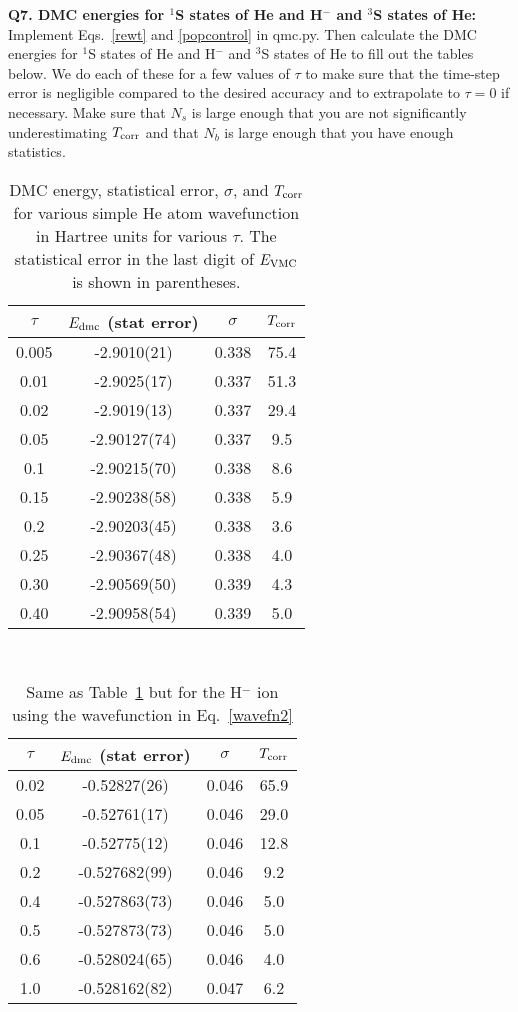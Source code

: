 \documentclass[11pt,aps,prb,amsmath,amssymb,superscriptaddress,notitlepage]{revtex4-1}
\def\Tcorr{T_{\rm corr}}
\providecommand{\tabularnewline}{\\}
\begin{document}
{\color{blue}
\textbf{Q7. DMC energies for $^1$S states of He and H$^-$ and $^3$S states of He:}\\
Implement Eqs.~\ref{rewt} and \ref{popcontrol} in qmc.py.
Then calculate the DMC energies for $^1$S states of He and H$^-$ and $^3$S states of He to fill out the
tables below.  We do each of these for a few values of $\tau$ to make sure that the time-step error is
negligible compared to the desired accuracy and to extrapolate to $\tau=0$ if necessary.
Make sure that $N_s$ is large enough that you are not significantly underestimating $\Tcorr$
and that $N_b$ is large enough that you have enough statistics.

\begin{table}[H]
\begin{center}
\color{blue}
\caption{DMC energy, statistical error, $\sigma$, and $\Tcorr$ for various simple He atom wavefunction
in Hartree units for various $\tau$. The statistical error in the last digit of $E_{\rm VMC}$ is shown in parentheses.}
\label{He_DMC}
\begin{tabular}{|c|c|c|c|}
\hline 
$\tau$ & \multicolumn{1}{c}{$E_{\rm dmc}$ (stat error)} | & $\sigma$ & $\Tcorr$ \tabularnewline
\hline 
0.005& -2.9010(21) & 0.338 & 75.4 \tabularnewline
0.01 & -2.9025(17) & 0.337 & 51.3 \tabularnewline
0.02 & -2.9019(13) & 0.337 & 29.4 \tabularnewline
0.05 & -2.90127(74) & 0.337 & 9.5 \tabularnewline
0.1  & -2.90215(70) & 0.338 & 8.6 \tabularnewline
0.15 & -2.90238(58) & 0.338 & 5.9 \tabularnewline
0.2  & -2.90203(45) & 0.338 & 3.6 \tabularnewline
0.25 & -2.90367(48) & 0.338 & 4.0 \tabularnewline
0.30 & -2.90569(50) & 0.339 & 4.3 \tabularnewline
0.40 & -2.90958(54) & 0.339 & 5.0 \tabularnewline
\hline 
\end{tabular}\\
\end{center}
\end{table}


\begin{table}[H]
\begin{center}
\color{blue}
\caption{Same as Table~\ref{He_DMC} but for the H$^-$ ion using the wavefunction in Eq.~\ref{wavefn2}}
\label{H-_DMC}
\begin{tabular}{|c|c|c|c|}
\hline 
$\tau$ & \multicolumn{1}{c}{$E_{\rm dmc}$ (stat error)} | & $\sigma$ & $\Tcorr$ \tabularnewline
\hline 
0.02 & -0.52827(26)  & 0.046 & 65.9 \tabularnewline
0.05 & -0.52761(17)  & 0.046 & 29.0 \tabularnewline
0.1  & -0.52775(12)  & 0.046 & 12.8 \tabularnewline
0.2  & -0.527682(99) & 0.046 & 9.2 \tabularnewline
0.4  & -0.527863(73) & 0.046 & 5.0 \tabularnewline
0.5  & -0.527873(73) & 0.046 & 5.0 \tabularnewline
0.6  & -0.528024(65) & 0.046 & 4.0 \tabularnewline
1.0  & -0.528162(82) & 0.047 & 6.2 \tabularnewline
\hline 
\end{tabular}\\
\end{center}
\end{table}


}
\end{document}
